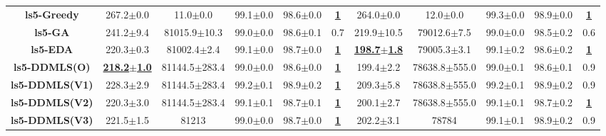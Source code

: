 \documentclass[lettersize,journal]{IEEEtran}
\begin{document}
\begin{table}[!t]
{\begin{tabular}{ccccccccccc}
        \midrule
        {\bfseries ls5-Greedy} &267.2$\pm$0.0 &11.0$\pm$0.0 & 99.1$\pm$0.0 &98.6$\pm$0.0 &\underline{\bfseries 1} &264.0$\pm$0.0 &12.0$\pm$0.0& 99.3$\pm$0.0 &98.9$\pm$0.0 &\underline{\bfseries 1} \\
        {\bfseries ls5-GA} &241.2$\pm$9.4 &81015.9$\pm$10.3 & 99.0$\pm$0.0 &98.6$\pm$0.1 &0.7 &219.9$\pm$10.5 &79012.6$\pm$7.5& 99.0$\pm$0.0 &98.5$\pm$0.2 &0.6 \\
        {\bfseries ls5-EDA} &220.3$\pm$0.3 &81002.4$\pm$2.4 & 99.1$\pm$0.0 &98.7$\pm$0.0 &\underline{\bfseries 1} &\underline{\bfseries198.7$\pm$1.8} &79005.3$\pm$3.1& 99.1$\pm$0.2 &98.6$\pm$0.2 &\underline{\bfseries 1}\\
        {\bfseries ls5-DDMLS(O)} &\underline{\bfseries218.2$\pm$1.0} &81144.5$\pm$283.4 & 99.0$\pm$0.0 &98.6$\pm$0.0 &\underline{\bfseries 1} &199.4$\pm$2.2 &78638.8$\pm$555.0& 99.0$\pm$0.1 &98.6$\pm$0.1 &0.9 \\
        {\bfseries ls5-DDMLS(V1)} &228.3$\pm$2.9 &81144.5$\pm$283.4 & 99.2$\pm$0.1 &98.9$\pm$0.2 &\underline{\bfseries 1} &209.3$\pm$5.8 &78638.8$\pm$555.0& 99.2$\pm$0.1 &98.9$\pm$0.2 &0.9 \\
        {\bfseries ls5-DDMLS(V2)} &220.3$\pm$3.0 &81144.5$\pm$283.4 & 99.1$\pm$0.1 &98.7$\pm$0.1 &\underline{\bfseries 1} &200.1$\pm$2.7 &78638.8$\pm$555.0& 99.1$\pm$0.1 &98.7$\pm$0.2 &\underline{\bfseries 1} \\
        {\bfseries ls5-DDMLS(V3)} &221.5$\pm$1.5 &81213 & 99.0$\pm$0.0 &98.7$\pm$0.0 &\underline{\bfseries 1} &202.2$\pm$3.1 &78784& 99.1$\pm$0.1 &98.9$\pm$0.2 &0.9 \\
        

\end{tabular}}
\end{table}
\end{document}
